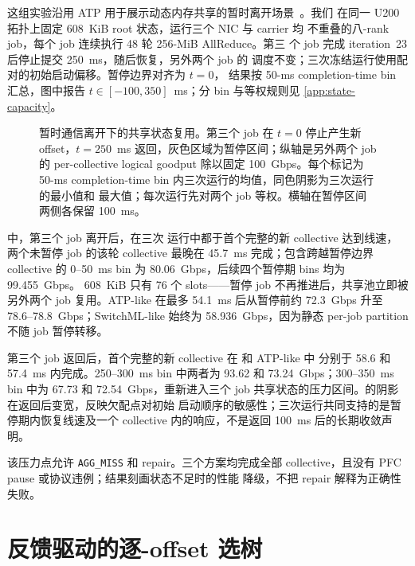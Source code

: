这组实验沿用 ATP 用于展示动态内存共享的暂时离开场景~\cite{atp}。我们
在同一 U200 拓扑上固定 608~KiB root 状态，运行三个 NIC 与 carrier 均
不重叠的八-rank job，每个 job 连续执行 48 轮 256-MiB AllReduce。第三
个 job 完成 iteration~23 后停止提交 250~ms，随后恢复，另外两个 job 的
调度不变；三次冻结运行使用配对的初始启动偏移。暂停边界对齐为 $t=0$，
结果按 50-ms completion-time bin 汇总，图中报告
$t\in[-100,350]$~ms；分 bin 与等权规则见 \cref{app:state-capacity}。

\begin{figure}[t]
\centering

\caption{暂时通信离开下的共享状态复用。第三个 job 在 $t=0$ 停止产生新
offset，$t=250$~ms 返回，灰色区域为暂停区间；纵轴是另外两个 job 的
per-collective logical goodput 除以固定 100~Gbps。每个标记为 50-ms
completion-time bin 内三次运行的均值，同色阴影为三次运行的最小值和
最大值；每次运行先对两个 job 等权。横轴在暂停区间两侧各保留
100~ms。}
\label{fig:multitenant-state}
\end{figure}

 中，第三个 job 离开后，\sysname 在三次
运行中都于首个完整的新 collective 达到线速，两个未暂停 job 的该轮
collective 最晚在 45.7~ms 完成；包含跨越暂停边界 collective 的
0--50~ms bin 为 80.06~Gbps，后续四个暂停期 bins 均为 99.455~Gbps。
608~KiB 只有 76 个 slots——暂停 job 不再推进后，共享池立即被另外两个
job 复用。ATP-like 在最多 54.1~ms 后从暂停前约 72.3~Gbps 升至
78.6--78.8~Gbps；SwitchML-like 始终为 58.936~Gbps，因为静态 per-job
partition 不随 job 暂停转移。

第三个 job 返回后，首个完整的新 collective 在 \sysname 和 ATP-like 中
分别于 58.6 和 57.4~ms 内完成。250--300~ms bin 中两者为 93.62 和
73.24~Gbps；300--350~ms bin 中为 67.73 和 72.54~Gbps，重新进入三个
job 共享状态的压力区间。\sysname 的阴影在返回后变宽，反映欠配点对初始
启动顺序的敏感性；三次运行共同支持的是暂停期内恢复线速及一个
collective 内的响应，不是返回 100~ms 后的长期收敛声明。

该压力点允许 \texttt{AGG\_MISS} 和 repair。三个方案均完成全部
collective，且没有 PFC pause 或协议违例；结果刻画状态不足时的性能
降级，不把 repair 解释为正确性失败。

\section{反馈驱动的逐-offset 选树}
\label{ssec:eval-multipath}

